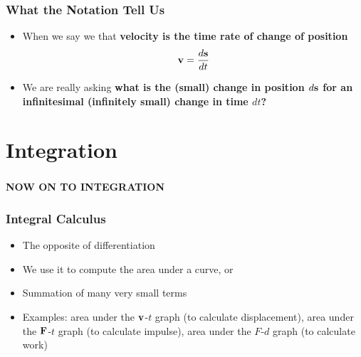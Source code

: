\documentclass[12pt,compress,aspectratio=169]{beamer}
\newcommand{\mb}[1]{\ensuremath\mathbf{#1}}
\begin{document}
\begin{frame}
  \frametitle{What the Notation Tell Us}
  \begin{itemize}
  \item When we say we that \textbf{velocity is the time rate of change of
    position}
    {\Large
      \begin{displaymath}
        \mb{v}=\frac{d\mb{s}}{dt}
      \end{displaymath}
    }
  \item We are really asking \textbf{what is the (small) change in position
    $d\mb{s}$ for an infinitesimal (infinitely small) change in time $dt$?}
  \end{itemize}
\end{frame}

\section{Integration}

\begin{frame}
  \frametitle{}
  \begin{center}
    {\LARGE\textbf{NOW ON TO INTEGRATION}}
  \end{center}
\end{frame}

\begin{frame}
  \frametitle{Integral Calculus}
  \begin{itemize}
  \item The opposite of differentiation
  \item We use it to compute the area under a curve, or
  \item Summation of many very small terms
  \item Examples: area under the $\mb{v}$-$t$ graph (to calculate
    displacement), area under the $\mb{F}$-$t$ graph (to calculate impulse),
    area under the $F$-$d$ graph (to calculate work)
  \end{itemize}
\end{frame}
\end{document}
